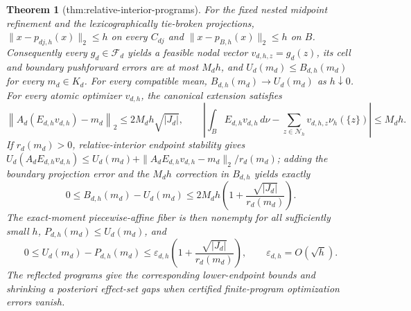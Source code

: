 \documentclass{article}
\newtheorem{theorem}{Theorem}
\begin{document}
\begin{theorem}[thm:relative-interior-programs]\label{thm:relative-interior-programs}
For the fixed nested midpoint refinement and the lexicographically tie-broken projections, \(\|x-p_{dj,h}(x)\|_2\le h\) on every \(C_{dj}\) and \(\|x-p_{B,h}(x)\|_2\le h\) on \(B\). Consequently every \(g_d\in\mathcal F_d\) yields a feasible nodal vector \(v_{d,h,z}=g_d(z)\), its cell and boundary pushforward errors are at most \(M_dh\), and \(U_d(m_d)\le B_{d,h}(m_d)\) for every \(m_d\in K_d\). For every compatible mean, \(B_{d,h}(m_d)\to U_d(m_d)\) as \(h\downarrow0\). For every atomic optimizer \(v_{d,h}\), the canonical extension satisfies \[\left\|A_d(E_{d,h}v_{d,h})-m_d\right\|_2\le2M_dh\sqrt{|J_d|},\qquad \left|\int_BE_{d,h}v_{d,h}\,d\nu-\sum_{z\in\mathcal N_h}v_{d,h,z}\nu_h(\{z\})\right|\le M_dh.\] If \(r_d(m_d)>0\), relative-interior endpoint stability gives \(U_d(A_dE_{d,h}v_{d,h})\le U_d(m_d)+\|A_dE_{d,h}v_{d,h}-m_d\|_2/r_d(m_d)\); adding the boundary projection error and the \(M_dh\) correction in \(B_{d,h}\) yields exactly \[0\le B_{d,h}(m_d)-U_d(m_d)\le2M_dh\left(1+\frac{\sqrt{|J_d|}}{r_d(m_d)}\right).\] The exact-moment piecewise-affine fiber is then nonempty for all sufficiently small \(h\), \(P_{d,h}(m_d)\le U_d(m_d)\), and \[0\le U_d(m_d)-P_{d,h}(m_d)\le\varepsilon_{d,h}\left(1+\frac{\sqrt{|J_d|}}{r_d(m_d)}\right),\qquad \varepsilon_{d,h}=O(\sqrt h).\] The reflected programs give the corresponding lower-endpoint bounds and shrinking a posteriori effect-set gaps when certified finite-program optimization errors vanish.
\end{theorem}
\end{document}
